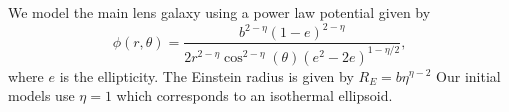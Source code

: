 We model the main lens galaxy using a power law potential given by
\begin{equation}
\phi(r, \theta) = \frac{b^{2 - \eta} (1 - e)^ {2 - \eta}}{2 r^{2 - \eta} \cos^{2 - \eta}(\theta) (e^2 - 2 e )^{1 - \eta / 2}},
\end{equation}
where $e$ is the ellipticity. The Einstein radius is given by $R_E = b \eta^{\eta - 2}$ Our initial models use $\eta = 1$ which corresponds to an isothermal ellipsoid. 